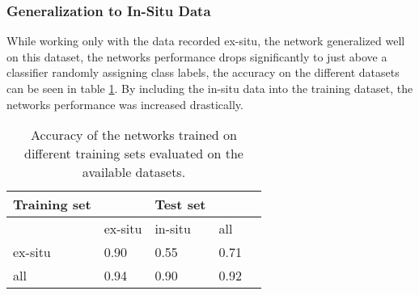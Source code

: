 
\subsubsection{Generalization to In-Situ Data}

While working only with the data recorded ex-situ, the network generalized well on this dataset, the networks performance drops significantly to just above a classifier randomly assigning class labels, the accuracy on the different datasets can be seen in table \ref{tab:AccuracyComparisonInception}. By including the in-situ data into the training dataset, the networks performance was increased drastically. \\

\begin{table}[H]
 \begin{center}
  \begin{tabular}{@{} *5l @{}} \toprule[2pt]
   Training set &  &Test set&  \\\midrule
    & ex-situ  & in-situ  & all   \\ 
   ex-situ  & 0.90 & 0.55 & 0.71\\ 
   all  & 0.94 & 0.90 & 0.92\\\bottomrule[2pt]

  \end{tabular}
 \end{center}
 \caption{Accuracy of the networks trained on different training sets evaluated on the available datasets.}
 \label{tab:AccuracyComparisonInception}
\end{table}


